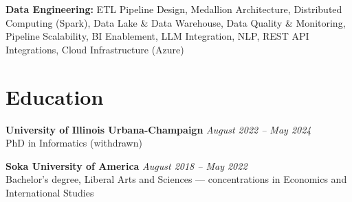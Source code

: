\documentclass[11pt, a4paper]{article}
\begin{document}
\vspace{4pt}
\textbf{Data Engineering:} ETL Pipeline Design, Medallion Architecture, Distributed Computing (Spark), Data Lake \& Data Warehouse, Data Quality \& Monitoring, Pipeline Scalability, BI Enablement, LLM Integration, NLP, REST API Integrations, Cloud Infrastructure (Azure)

\section{Education}

\textbf{University of Illinois Urbana-Champaign} \hfill \textit{August 2022 -- May 2024}\\
PhD in Informatics (withdrawn)

\vspace{4pt}
\textbf{Soka University of America} \hfill \textit{August 2018 -- May 2022}\\
Bachelor's degree, Liberal Arts and Sciences --- concentrations in Economics and International Studies
\end{document}
